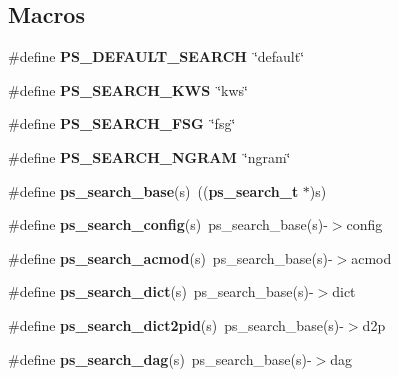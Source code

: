 \subsection*{Macros}
\begin{DoxyCompactItemize}
\item 
\#define {\bfseries P\-S\-\_\-\-D\-E\-F\-A\-U\-L\-T\-\_\-\-S\-E\-A\-R\-C\-H}~\char`\"{}default\char`\"{}\label{pocketsphinx__internal_8h_a84a97dd05f15264c6949498feb139671}

\item 
\#define {\bfseries P\-S\-\_\-\-S\-E\-A\-R\-C\-H\-\_\-\-K\-W\-S}~\char`\"{}kws\char`\"{}\label{pocketsphinx__internal_8h_ace7921a5c754395cdf2d197039553b05}

\item 
\#define {\bfseries P\-S\-\_\-\-S\-E\-A\-R\-C\-H\-\_\-\-F\-S\-G}~\char`\"{}fsg\char`\"{}\label{pocketsphinx__internal_8h_a95d43c0bca0e340b57d679dcd84a8fd0}

\item 
\#define {\bfseries P\-S\-\_\-\-S\-E\-A\-R\-C\-H\-\_\-\-N\-G\-R\-A\-M}~\char`\"{}ngram\char`\"{}\label{pocketsphinx__internal_8h_adc5ecfa80f4969c3ff1faa08f3cc001a}

\item 
\#define {\bfseries ps\-\_\-search\-\_\-base}(s)~(({\bf ps\-\_\-search\-\_\-t} $\ast$)s)\label{pocketsphinx__internal_8h_a27058b099b21336e1fd50299f8596171}

\item 
\#define {\bfseries ps\-\_\-search\-\_\-config}(s)~ps\-\_\-search\-\_\-base(s)-\/$>$config\label{pocketsphinx__internal_8h_a856f984d97ce3d4ac640f1a9061065cf}

\item 
\#define {\bfseries ps\-\_\-search\-\_\-acmod}(s)~ps\-\_\-search\-\_\-base(s)-\/$>$acmod\label{pocketsphinx__internal_8h_a03b1edeb67c83451296c2d99b22621a9}

\item 
\#define {\bfseries ps\-\_\-search\-\_\-dict}(s)~ps\-\_\-search\-\_\-base(s)-\/$>$dict\label{pocketsphinx__internal_8h_ae2aad02cace01fbb2f345a0ead69c672}

\item 
\#define {\bfseries ps\-\_\-search\-\_\-dict2pid}(s)~ps\-\_\-search\-\_\-base(s)-\/$>$d2p\label{pocketsphinx__internal_8h_a5c91d7c3f11ba5b938705d1fe65676f9}

\item 
\#define {\bfseries ps\-\_\-search\-\_\-dag}(s)~ps\-\_\-search\-\_\-base(s)-\/$>$dag\label{pocketsphinx__internal_8h_a90e5addd9875c355d99208246802f7d8}


\end{DoxyCompactItemize}
